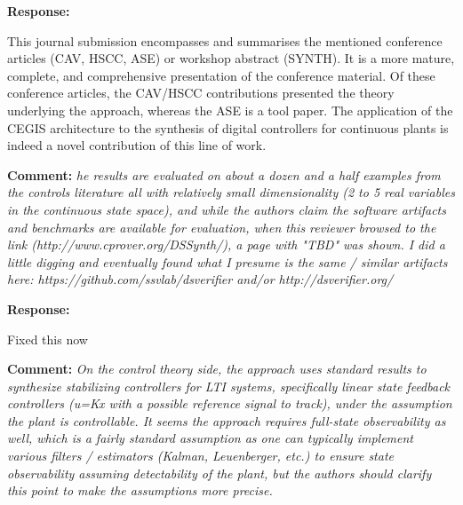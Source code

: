 \documentclass{article}
\begin{document}
{\bf Response: }

This journal submission encompasses and summarises the mentioned conference articles (CAV, HSCC, ASE) or workshop abstract (SYNTH). 
It is a more mature, complete, and comprehensive presentation of the conference material. 
Of these conference articles, the CAV/HSCC contributions presented the theory underlying the approach, 
whereas the ASE is a tool paper. 
The application of the CEGIS architecture to the synthesis of digital controllers for continuous plants is indeed a novel contribution of this line of work. 


\vspace{2em}
{\bf Comment: } {\itshape he results are evaluated on about a dozen and a half examples from the controls literature all with relatively small
dimensionality (2 to 5 real variables in the continuous state space), and while the authors claim the software artifacts and benchmarks are available
for evaluation, when this reviewer browsed to the link (http://www.cprover.org/DSSynth/), a page with "TBD" was shown. I did a little digging and
eventually found what I presume is the same / similar artifacts here: https://github.com/ssvlab/dsverifier and/or http://dsverifier.org/}

\vspace{1em}
{\bf Response: }

Fixed this now


\vspace{2em}
{\bf Comment: } {\itshape On the control theory side, the approach uses standard results to synthesize stabilizing controllers for LTI systems,
specifically linear state feedback controllers (u=Kx with a possible reference signal to track), under the assumption the plant is controllable. It
seems the approach requires full-state observability as well, which is a fairly standard assumption as one can typically implement various filters /
estimators (Kalman, Leuenberger, etc.) to ensure state observability assuming detectability of the plant, but the authors should clarify this point to
make the assumptions more precise.}
\end{document}
